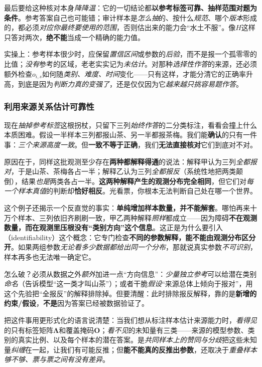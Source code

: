 最后要给这种核对本身\emph{降降温}：它的一切结论都\textbf{以参考标签可靠、抽样范围对题为条件}。参考答案自己也可能错；审计样本是\emph{怎么抽}的、按什么\emph{规范}、哪个\emph{版本}形成的，都必须\emph{对应你最终要使用的范围}，否则估出来的能力会“水土不服”。像$H$这样只答对两次，\textbf{绝不能}当成一个精确的能力值。

实操上：参考样本很少时，应保留\emph{置信区间}或参数的\emph{后验}，而不是报一个孤零零的比值；\emph{没有}参考的区域，老老实实记为\emph{未估计}。对那种\emph{选择性作答}的来源，还必须额外检查$o_{i,s}$如何随\emph{类别、难度、时间}变化——只有这样，才能分清它的正确率升高，到底是因为\emph{判断力真的变强了}，还是仅仅因为它\emph{越来越只挑容易题作答}。

\subsubsection{利用来源关系估计可靠性}
\label{sec:knowledge-fusion-relational-reliability}

现在\emph{抽掉参考标签}这根拐杖，只留下三列\emph{始终作答}的二分类标注，看看会撞上什么本质困难。假设一半样本三列都报山茶、另一半都报茶梅。我们能\textbf{确认}的只有一件事：\emph{三个来源高度一致}。但\textbf{一致不等于正确}，我们\textbf{无法直接核对}它们到底对不对。

原因在于，同样这批观测至少存在\textbf{两种都解释得通}的说法：解释甲认为三列\emph{全都报对}，于是山茶、茶梅各占一半；解释乙认为三列\emph{全都报反}（系统性地把两类颠倒），结果\emph{也是}两类各占一半。\textbf{这两种解释产生的观测分布完全相同}，但它们对\emph{每一个样本真值}的判断却\textbf{恰好相反}。光看票，你根本无法判断自己处在哪一个世界。

这个例子还揭示一个反直觉的事实：\textbf{单纯增加样本数量，并不能解套}。哪怕再来十万个样本、三列依旧齐刷刷一致，甲乙两种解释\emph{照样}都成立——因为障碍\textbf{不在观测数量，而在观测里压根没有“类别方向”这个信息}。这正是为什么要引入（identifiability）这个概念：它专门检查\textbf{不同的参数解释，能不能由观测分布区分开}。如果两组参数\emph{无论看多少数据都给出同一个分布}，那就说真实参数\emph{不可识别}，样本再多也无法唯一确定它。

怎么破？必须从数据之外\emph{额外}加进一点“方向信息”：\emph{少量独立参考}可以给潜在类别\emph{命名}（告诉模型“这一类才叫山茶”）；或者干脆\emph{假设}“来源总体上倾向于报对”，用这个先验把“全报反”的解释排除掉。但要清醒：此时排除报反解释，靠的是\textbf{新增的约束/假设}，\textbf{不是}因为答案已经被数据验证了。

把这件事用更形式化的语言说清楚：当我们想从标注样本估计来源能力时，\emph{看得见}的只有标签矩阵$\bm{\Lambda}$和覆盖掩码$\bm{O}$；\emph{看不见}的未知量有三类——来源的模型参数、类别的真实比例、以及每个样本的潜在答案。是\emph{共同样本上的赞同与分歧}把这些未知量\emph{纠缠}在一起，让我们有可能反推；但\textbf{能不能真的反推出参数}，还取决于\emph{重叠样本够不够、票与票之间有没有差异}。

